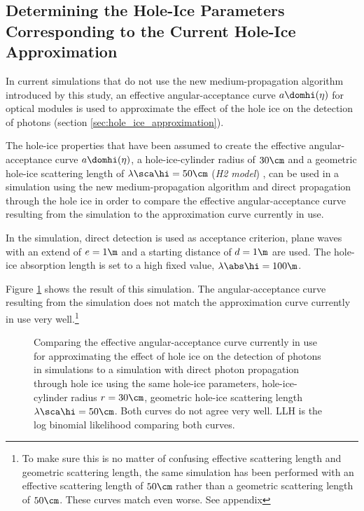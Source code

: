 
\subsection{Determining the Hole-Ice Parameters Corresponding to the Current Hole-Ice Approximation}
\label{sec:parameter_scan}

In current \clsim simulations that do not use the new medium-propagation algorithm introduced by this study, an effective angular-acceptance curve $a\domhi(\eta)$ for optical modules is used to approximate the effect of the hole ice on the detection of photons (section \ref{sec:hole_ice_approximation}).

The hole-ice properties that have been assumed to create the effective angular-acceptance curve $a\domhi(\eta)$, a hole-ice-cylinder radius of $30\cm$ and a geometric hole-ice scattering length of $\lambda\sca\hi = 50\cm$ (\textit{H2 model}) \cite{holeicestudieswithyag}, can be used in a \clsim simulation using the new medium-propagation algorithm and direct propagation through the hole ice in order to compare the effective angular-acceptance curve resulting from the simulation to the approximation curve currently in use.


In the simulation, direct detection is used as acceptance criterion, plane waves with an extend of $e=1\m$ and a starting distance of $d=1\m$ are used. The hole-ice absorption length is set to a high fixed value, $\lambda\abs\hi = 100\m$.

Figure \ref{fig:chie4Ite} shows the result of this simulation. The angular-acceptance curve resulting from the simulation does not match the approximation curve currently in use very well.\footnote{To make sure this is no matter of confusing effective scattering length and geometric scattering length, the same simulation has been performed with an effective scattering length of $50\cm$ rather than a geometric scattering length of $50\cm$. These curves match even worse. See appendix }

\begin{figure}[htbp]
  \caption{Comparing the effective angular-acceptance curve currently in use for approximating the effect of hole ice on the detection of photons in simulations to a simulation with direct photon propagation through hole ice using the same hole-ice parameters, hole-ice-cylinder radius $r=30\cm$, geometric hole-ice scattering length $\lambda\sca\hi = 50\cm$. Both curves do not agree very well. LLH is the log binomial likelihood comparing both curves.}
  \label{fig:chie4Ite}
\end{figure}

